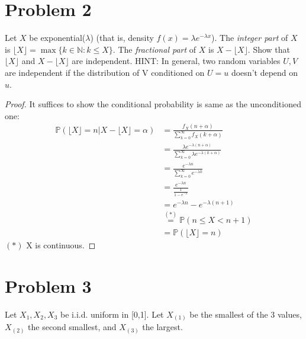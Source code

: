 \documentclass{article}
\newcommand{\prob}{\mathbb{P}}
\begin{document}
\section*{Problem 2}
Let $X$ be exponential($\lambda$) (that is, density $f(x)=\lambda e^{-\lambda x}$). The \textit{integer part} of $X$ is $\lfloor X\rfloor = \max\{k\in\mathbb{N}:k\leq X\}$. The \textit{fractional part} of $X$ is $X-\lfloor X \rfloor$. Show that $\lfloor X\rfloor$ and $X-\lfloor X\rfloor$ are independent. HINT: In general, two random variables $U,V$ are independent if the distribution of V conditioned on $U=u$ doesn't depend on $u$.
\color{blue}
\begin{proof} It suffices to show the conditional probability is same as the unconditioned one:
\begin{equation*}
\begin{split}
    \prob(\lfloor X\rfloor=n\vert X-\lfloor X\rfloor = \alpha)&= \frac{f_X(n+\alpha)}{\sum_{k=0}^\infty f_X(k+\alpha)}\\
        &=\frac{\lambda e^{-\lambda (n+\alpha)}}{\sum_{k=0}^\infty\lambda e^{-\lambda (k+\alpha)}}\\
        &=\frac{e^{-\lambda n}}{\sum_{k=0}^\infty e^{-\lambda k}}\\
        &=\frac{e^{-\lambda n}}{\frac{1}{1-e^{-\lambda}}}\\
        &=e^{-\lambda n}-e^{-\lambda(n+1)}\\
        &\stackrel{(*)}{=} \prob(n\leq X < n+1)\\
        &=\prob(\lfloor X \rfloor = n)
\end{split}
\end{equation*}
$(*)$ X is continuous.
\end{proof}
\color{black}
\section*{Problem 3}
Let $X_1,X_2,X_3$ be i.i.d. uniform in [0,1]. Let $X_{(1)}$ be the smallest of the 3 values, $X_{(2)}$ the second smallest, and $X_{(3)}$ the largest.
\end{document}
